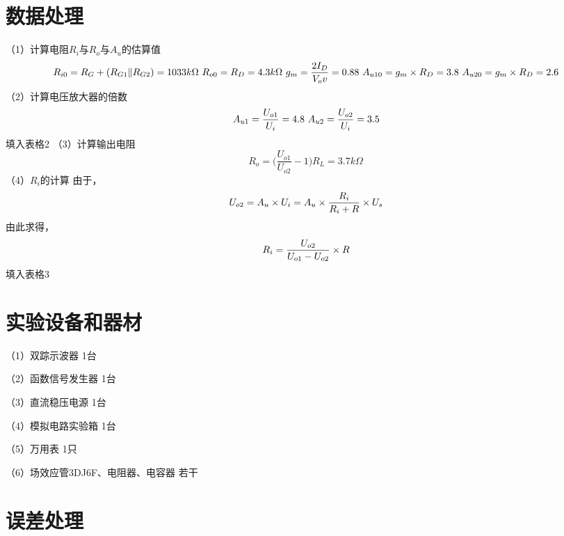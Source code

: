 \documentclass{article}
\begin{document}
	\section{ 数据处理}
	（1）计算电阻$R_i$与$R_o$与$A_u$的估算值
	\begin{equation*}
		\ R_{i0}=R_G+(R_{G1}\|R_{G2})=1033k\Omega\\
		\ R_{o0}=R_D=4.3k\Omega\\
		\ g_m=\frac{2I_D}{V_ov}=0.88\\
		\ A_{u10}=g_m\times R_D=3.8\\
		\ A_{u20}=g_m\times R_D=2.6\\
	\end{equation*}
	（2）计算电压放大器的倍数
	\begin{equation*}
		\ A_{u1}=\frac{U_{o1}}{U_i}=4.8\\
		\ A_{u2}=\frac{U_{o2}}{U_i}=3.5
	\end{equation*}
	填入表格2
	（3）计算输出电阻
	\begin{equation*}
	     \ R_o=\bigg (\frac{U_{o1}}{U_{o2}}-1\bigg )R_L=3.7k\Omega
	\end{equation*}
	（4）$R_i$的计算
	由于，
	\begin{equation*}
		\ U_{o2}=A_u\times U_i=A_u\times\frac{R_i}{R_i+R}\times U_s\\
	\end{equation*}
	由此求得，
	\begin{equation*}
		\ R_i=\frac{U_{o2}}{U_{o1}-U_{o2}}\times R\\
	\end{equation*}
	填入表格3
	\section{ 实验设备和器材}
	（1）双踪示波器             \qquad \qquad \qquad \qquad \qquad  \qquad           1台\par
	（2）函数信号发生器          \qquad  \qquad \qquad \qquad       \qquad           1台\par
	（3）直流稳压电源             \qquad \quad \qquad \qquad \qquad \qquad           1台\par
	（4）模拟电路实验箱            \qquad  \qquad \qquad \qquad\qquad                1台\par
	（5）万用表                   \qquad  \qquad \qquad \qquad \qquad \qquad \qquad  1只\par
	（6）场效应管3DJ6F、电阻器、电容器  \qquad                                        若干
\section{误差处理}
\end{document}
